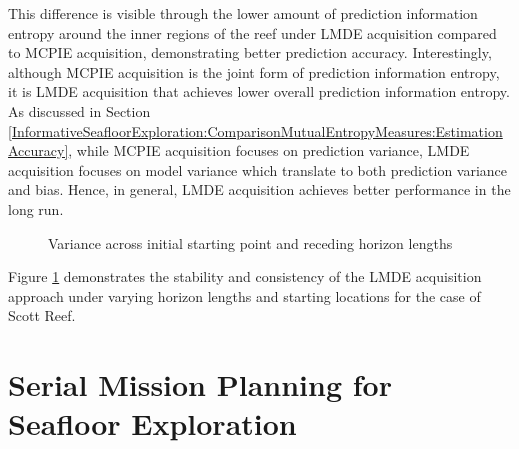 			This difference is visible through the lower amount of prediction information entropy around the inner regions of the reef under LMDE acquisition compared to MCPIE acquisition, demonstrating better prediction accuracy. Interestingly, although MCPIE acquisition is the joint form of prediction information entropy, it is LMDE acquisition that achieves lower overall prediction information entropy. As discussed in Section \ref{InformativeSeafloorExploration:ComparisonMutualEntropyMeasures:EstimationAccuracy}, while MCPIE acquisition focuses on prediction variance, LMDE acquisition focuses on model variance which translate to both prediction variance and bias. Hence, in general, LMDE acquisition achieves better performance in the long run.

			\begin{figure}[!htbp]
			\centering
			\caption{Variance across initial starting point and receding horizon lengths}
			\label{Figure:VarianceSimulation}
			\end{figure}	
				
			Figure \ref{Figure:VarianceSimulation} demonstrates the stability and consistency of the LMDE acquisition approach under varying horizon lengths and starting locations for the case of Scott Reef. 
			
	\section{Serial Mission Planning for Seafloor Exploration}
	\label{Appendix:SeafloorExplorationTimeLapse:Serial}
	
